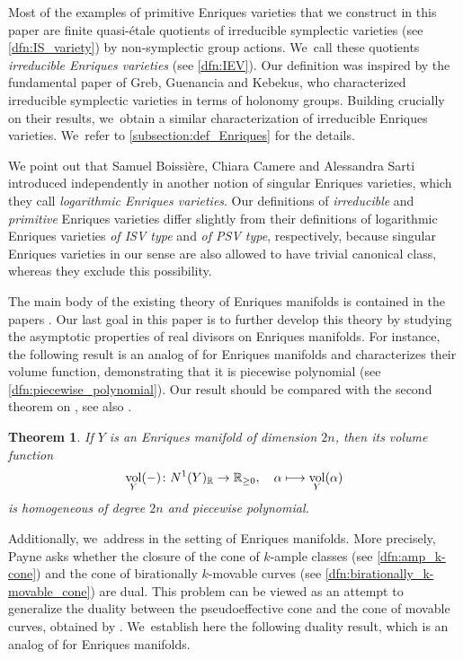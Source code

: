 \documentclass[10pt]{amsart}
\newcommand\mto{\mathchoice{\longmapsto}{\mapsto}{\mapsto}{\mapsto}}
\theoremstyle{plain}
\newtheorem{thm}{Theorem}[section]
\theoremstyle{definition}
\newcommand{\R}{\mathbb{R}}
\DeclareMathOperator{\vol}{vol}
\begin{document}
Most of the examples of primitive Enriques varieties that we construct in this paper are finite quasi-étale quotients of irreducible symplectic varieties (see \autoref{dfn:IS_variety}) by non-symplectic group actions. We~call these quotients \emph{irreducible Enriques varieties} (see \autoref{dfn:IEV}).
Our definition was inspired by the fundamental paper \cite{GGK19} of Greb, Guenancia and Kebekus, who characterized irreducible symplectic varieties in terms of holonomy groups. Building crucially on their results, we~obtain a similar characterization of irreducible Enriques varieties. We~refer to \autoref{subsection:def_Enriques} for the details.

We point out that Samuel Boissière, Chiara Camere and Alessandra Sarti introduced independently in \cite{BCS24} another notion of singular Enriques varieties, which they call \emph{logarithmic Enriques varieties}. Our definitions of \emph{irreducible} and \emph{primitive} Enriques varieties differ slightly from their definitions of logarithmic Enriques varieties \emph{of ISV type} and \emph{of PSV type}, respectively, because singular Enriques varieties in our sense are also allowed to have trivial canonical class, whereas they exclude this possibility.

The main body of the existing theory of Enriques manifolds is contained in the papers \cite{BNWS11,OS11a,OS11b}. Our last goal in this paper is to further develop this theory by studying the asymptotic properties of real divisors on Enriques manifolds.
For instance, the following result is an analog of \cite[Th.\,1.6(2)]{Denisi23} for Enriques manifolds and characterizes their volume function, demonstrating that it is piecewise polynomial (see \autoref{dfn:piecewise_polynomial}). Our result should be compared with the second theorem on \cite[p.\,210]{BKS04}, see also \cite[\S 3.3]{BKS04}.

\begin{thm}
\label{thm:volume_function_Enriques}
If $Y$ is an Enriques manifold of dimension $2n$, then its volume function\vspace*{-3pt}
\[
\vol_Y(-) \colon N^1(Y)_\R \to \R_{\geq 0}, \quad \alpha \mto \vol_Y(\alpha)
\]
is homogeneous of degree $2n$ and piecewise polynomial.
\end{thm}

Additionally, we~address \cite[Problem]{Payne06} in the setting of Enriques manifolds. More precisely, Payne asks whether the closure of the cone of $k$\nobreakdash-ample classes (see \autoref{dfn:amp_k-cone}) and the cone of birationally $k$\nobreakdash-movable curves (see \autoref{dfn:birationally_k-movable_cone}) are dual. This problem can be viewed as an attempt to generalize the duality between the pseudoeffective cone and the cone of movable curves, obtained by \cite[Th.\,2.2]{BDPP13}. We~establish here the following duality result, which is an analog of \cite[Th.\,B]{DRO25} for Enriques manifolds.
\end{document}
